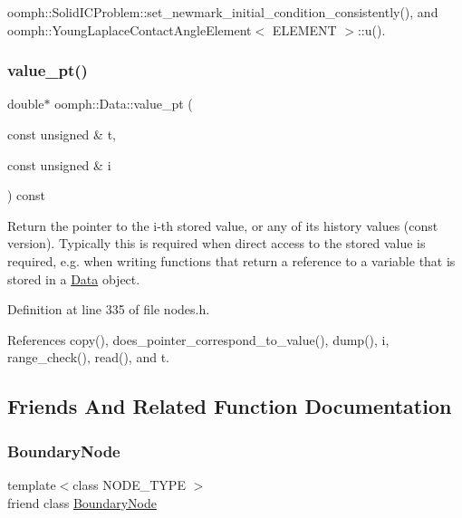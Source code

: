 oomph\+::\+Solid\+I\+C\+Problem\+::set\+\_\+newmark\+\_\+initial\+\_\+condition\+\_\+consistently(), and oomph\+::\+Young\+Laplace\+Contact\+Angle\+Element$<$ E\+L\+E\+M\+E\+N\+T $>$\+::u().

\mbox{\label{classoomph_1_1Data_ae96cadc48ab7d39aa6ed7bd91abe2e47}} 
\subsubsection{\texorpdfstring{value\+\_\+pt()}{value\_pt()}\hspace{0.1cm}{\footnotesize\ttfamily [2/2]}}
{\footnotesize\ttfamily double$\ast$ oomph\+::\+Data\+::value\+\_\+pt (\begin{DoxyParamCaption}\item[{const unsigned \&}]{t,  }\item[{const unsigned \&}]{i }\end{DoxyParamCaption}) const\hspace{0.3cm}{\ttfamily [inline]}}



Return the pointer to the i-\/th stored value, or any of its history values (const version). Typically this is required when direct access to the stored value is required, e.\+g. when writing functions that return a reference to a variable that is stored in a \hyperlink{classoomph_1_1Data}{Data} object. 



Definition at line 335 of file nodes.\+h.



References copy(), does\+\_\+pointer\+\_\+correspond\+\_\+to\+\_\+value(), dump(), i, range\+\_\+check(), read(), and t.



\subsection{Friends And Related Function Documentation}
\mbox{\label{classoomph_1_1Data_a75261ed432ecec54f676ec5bb0db4d5a}} 
\subsubsection{\texorpdfstring{Boundary\+Node}{BoundaryNode}}
{\footnotesize\ttfamily template$<$class N\+O\+D\+E\+\_\+\+T\+Y\+PE $>$ \\
friend class \hyperlink{classoomph_1_1BoundaryNode}{Boundary\+Node}\hspace{0.3cm}{\ttfamily [friend]}}



